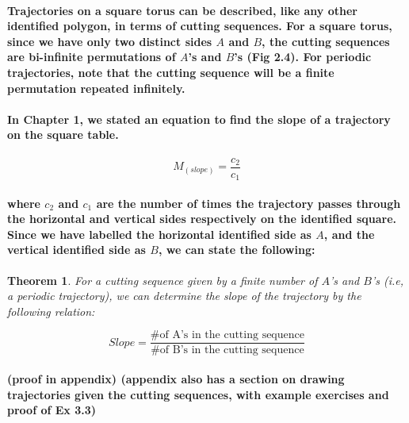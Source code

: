 \documentclass{report}
\newtheorem{theorem}{Theorem}[chapter]
\begin{document}
\paragraph{Trajectories on a square torus can be described, like any other identified polygon, in terms of cutting sequences. For a square torus, since we have only two distinct sides $A$ and $B$, the cutting sequences are bi-infinite permutations of $A$’s and $B$’s (Fig 2.4). For periodic trajectories, note that the cutting sequence will be a finite permutation repeated infinitely.}



\paragraph{In Chapter 1, we stated an equation to find the slope of a trajectory on the square table.}


\begin{displaymath}
{M_{(slope)}=\frac{c_{2}}{c_{1}}}
\end{displaymath}


\pagebreak

\paragraph{where $c_{2}$ and $c_{1}$ are the number of times the trajectory passes through the horizontal and vertical sides respectively on the identified square. Since we have labelled the horizontal identified side as $A$, and the vertical identified side as $B$, we can state the following:}


\begin{theorem}
{For a cutting sequence given by a finite number of $A$’s and $B$’s (i.e, a periodic trajectory), we can determine the slope of the trajectory by the following relation:}

\begin{equation}
{Slope = \frac{\text{\# of A's in the cutting sequence}}{\text{\# of B's in the cutting sequence}} }
\end{equation}
\end{theorem}


\paragraph{(proof in appendix) 
(appendix also has a section on drawing trajectories given the cutting sequences, with example exercises and proof of Ex 3.3)}
\end{document}
